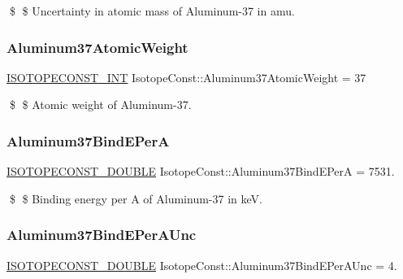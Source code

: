 \$ \$ Uncertainty in atomic mass of Aluminum-\/37 in amu. \mbox{\label{group___isotope_const-_aluminum-_al37_ga00549e4ccbc563b0f2835fcea6516cdd}} 
\subsubsection{\texorpdfstring{Aluminum37\+Atomic\+Weight}{Aluminum37AtomicWeight}}
{\footnotesize\ttfamily \mbox{\hyperlink{group___isotope_const-_macros_ga5f18360b3e99483a35c32d789e62621c}{I\+S\+O\+T\+O\+P\+E\+C\+O\+N\+S\+T\+\_\+\+I\+NT}} Isotope\+Const\+::\+Aluminum37\+Atomic\+Weight = 37}

\$ \$ Atomic weight of Aluminum-\/37. \mbox{\label{group___isotope_const-_aluminum-_al37_gafc703229af9ccc9cf92138a8c3bbd84b}} 
\subsubsection{\texorpdfstring{Aluminum37\+Bind\+E\+PerA}{Aluminum37BindEPerA}}
{\footnotesize\ttfamily \mbox{\hyperlink{group___isotope_const-_macros_ga8f45a7272ce02c0b4c65c44636ed719a}{I\+S\+O\+T\+O\+P\+E\+C\+O\+N\+S\+T\+\_\+\+D\+O\+U\+B\+LE}} Isotope\+Const\+::\+Aluminum37\+Bind\+E\+PerA = 7531.}

\$ \$ Binding energy per A of Aluminum-\/37 in keV. \mbox{\label{group___isotope_const-_aluminum-_al37_ga3a03002664c53cfe1d7393efcb569d3c}} 
\subsubsection{\texorpdfstring{Aluminum37\+Bind\+E\+Per\+A\+Unc}{Aluminum37BindEPerAUnc}}
{\footnotesize\ttfamily \mbox{\hyperlink{group___isotope_const-_macros_ga8f45a7272ce02c0b4c65c44636ed719a}{I\+S\+O\+T\+O\+P\+E\+C\+O\+N\+S\+T\+\_\+\+D\+O\+U\+B\+LE}} Isotope\+Const\+::\+Aluminum37\+Bind\+E\+Per\+A\+Unc = 4.}

